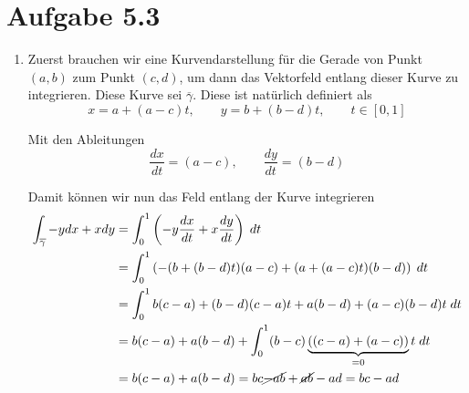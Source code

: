 \documentclass[a4paper,german,12pt,smallheadings]{scrartcl}
\begin{document}
\section*{Aufgabe 5.3}
\begin{enumerate}[(1)]
  \item
    Zuerst brauchen wir eine Kurvendarstellung für die Gerade von Punkt $(a,b)$
    zum Punkt $(c,d)$, um dann das Vektorfeld entlang dieser Kurve zu
    integrieren. Diese Kurve sei $\overline{\gamma}$. Diese ist natürlich
    definiert als
    \begin{equation*}
      x = a + (a-c)t, \qquad y = b + (b-d)t, \qquad t \in [0,1]
    \end{equation*}

    Mit den Ableitungen
    \begin{equation*}
      \frac{dx}{dt} = (a-c), \qquad \frac{dy}{dt} = (b-d)
    \end{equation*}

    Damit können wir nun das Feld entlang der Kurve integrieren
    \begin{align*}
      \int_{\overline{\gamma}} -y dx + x dy &= \int_0^1 \left(-y \frac{dx}{dt} + x \frac{dy}{dt}\right) \; dt \\
                                            &= \int_0^1 \left(-(b + (b-d)t)(a-c) + (a+(a-c)t)(b-d)\right) \; dt \\
                                            &= \int_0^1 b(c-a) + (b-d)(c-a)t + a(b-d)+(a-c)(b-d)t \; dt \\
                                            &= b(c-a)+a(b-d) +\int_0^1 (b-c)\underbrace{((c-a) + (a-c))}_{=0}t \; dt \\
                                            &= b(c-a)+a(b-d) = bc\cancel{-ab}+\cancel{ab}-ad = bc-ad
    \end{align*}
\end{enumerate}
\end{document}

